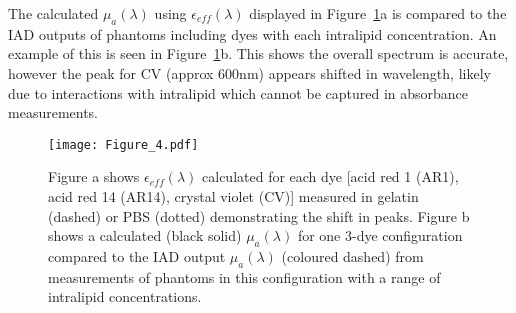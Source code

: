 The calculated $\mu_a(\lambda)$ using $\epsilon_{eff}(\lambda)$ displayed in Figure~\ref{fig:Phantombackgrounds}a is compared to the IAD outputs of phantoms including dyes with each intralipid concentration.
An example of this is seen in Figure~\ref{fig:Phantombackgrounds}b. This shows the overall spectrum is accurate, however the peak for CV (approx 600nm) appears shifted in wavelength, likely due to interactions with intralipid which cannot be captured in absorbance measurements. 

\begin{figure}[htbp]
    \centering
    \texttt{[image: Figure\_4.pdf]}
    \caption{Figure a shows $\epsilon_{eff}(\lambda)$ calculated for each dye [acid red 1 (AR1), acid red 14 (AR14), crystal violet (CV)] measured in gelatin (dashed) or PBS (dotted) demonstrating the shift in peaks. Figure b shows a calculated (black solid) $\mu_a(\lambda)$ for one 3-dye configuration compared to the IAD output $\mu_a(\lambda)$ (coloured dashed) from measurements of phantoms in this configuration with a range of intralipid concentrations.}
    \label{fig:Phantombackgrounds}
\end{figure}

